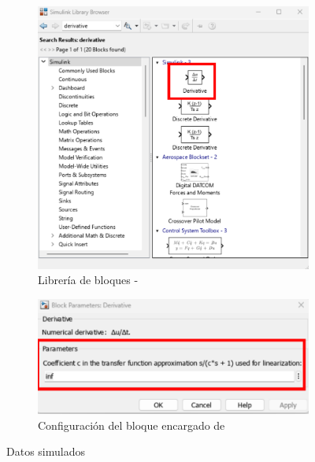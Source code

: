 \begin{figure}[htbp]
    \centering
    \begin{subfigure}[b]{0.35\textwidth}
        \centering
        \includegraphics[width=\textwidth]{fig/Capitulo5/Caso_de_estudio_PID/lib_derivative.pdf}
        \caption{Librería de bloques -}
        \label{fig:bias_sim}
    \end{subfigure}
    \hfill
    \begin{subfigure}[b]{0.45\textwidth}
        \centering
        \includegraphics[width=\textwidth]{fig/Capitulo5/Caso_de_estudio_PID/config_derivative.pdf}
        \caption{Configuración del bloque encargado de }
        \label{fig:oe_sim}
    \end{subfigure}
    \caption{Datos simulados}
    \label{fig:data_simulated}
\end{figure}

